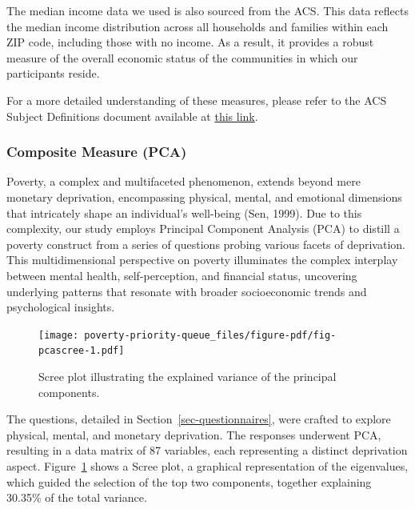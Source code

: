 \documentclass[
]{report}
\begin{document}
The median income data we used is also sourced from the ACS. This data
reflects the median income distribution across all households and
families within each ZIP code, including those with no income. As a
result, it provides a robust measure of the overall economic status of
the communities in which our participants reside.

For a more detailed understanding of these measures, please refer to the
ACS Subject Definitions document available at
\href{https://www2.census.gov/programs-surveys/acs/tech_docs/subject_definitions/2021_ACSSubjectDefinitions.pdf}{this
link}.

\hypertarget{composite-measure-pca}{%
\subsubsection{Composite Measure (PCA)}\label{composite-measure-pca}}

Poverty, a complex and multifaceted phenomenon, extends beyond mere
monetary deprivation, encompassing physical, mental, and emotional
dimensions that intricately shape an individual's well-being (Sen,
1999). Due to this complexity, our study employs Principal Component
Analysis (PCA) to distill a poverty construct from a series of questions
probing various facets of deprivation. This multidimensional perspective
on poverty illuminates the complex interplay between mental health,
self-perception, and financial status, uncovering underlying patterns
that resonate with broader socioeconomic trends and psychological
insights.

\begin{figure}

{\centering \texttt{[image: poverty-priority-queue\_files/figure-pdf/fig-pcascree-1.pdf]}

}

\caption{\label{fig-pcascree}Scree plot illustrating the explained
variance of the principal components.}

\end{figure}

The questions, detailed in Section~\ref{sec-questionnaires}, were
crafted to explore physical, mental, and monetary deprivation. The
responses underwent PCA, resulting in a data matrix of 87 variables,
each representing a distinct deprivation aspect.
Figure~\ref{fig-pcascree} shows a Scree plot, a graphical representation
of the eigenvalues, which guided the selection of the top two
components, together explaining 30.35\% of the total variance.
\end{document}
